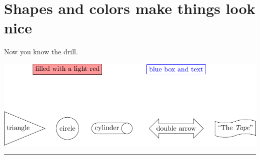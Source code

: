 \documentclass[12pt]{article}
\begin{document}

\pagebreak
\section{Shapes and colors make things look nice}

Now you know the drill.
\vspace{1em}

\includegraphics{_img_src/02_node_shapes_colors.pdf}

\vspace{1em}
\hrule 
\vspace{1em}

\begin{tikzpicture}
    
\end{tikzpicture}
\end{document}
